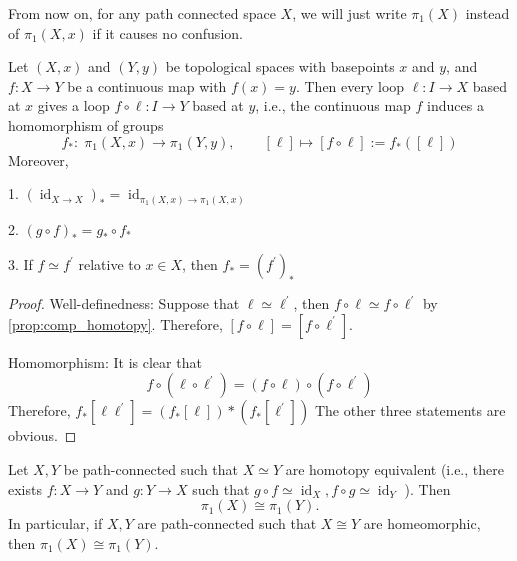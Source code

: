 From now on, for any path connected space \(X\), we will just write \({\pi }_{1}\left( X\right)\) instead of \({\pi }_{1}\left( {X,x}\right)\) if it causes no confusion.

\begin{proposition} \label{prop:pi1_homomorphism} Let $(X, x)$ and $(Y, y)$ be topological spaces with basepoints \(x\) and \(y\), and \(f : X \rightarrow  Y\) be a continuous map with \(f\left( x\right)  = y\). Then every loop \(\ell  : I \rightarrow  X\) based at \(x\) gives a loop \(f \circ  \ell  : I \rightarrow  Y\) based at \(y\), i.e., the continuous map \(f\) induces a homomorphism of groups
\[
{f}_{ * } : \;{\pi }_{1}\left( {X,x}\right)  \rightarrow  {\pi }_{1}\left( {Y,y}\right),
\quad \quad
\left\lbrack  \ell \right\rbrack   \mapsto  \left\lbrack  {f \circ  \ell }\right\rbrack   \mathrel{\text{ := }} {f}_{ * }\left( \left\lbrack  \ell \right\rbrack  \right)
\]
Moreover,

1. \({\left( {\operatorname{id}}_{X \rightarrow  X}\right) }_{ * } = {\operatorname{id}}_{{\pi }_{1}\left( {X,x}\right)  \rightarrow  {\pi }_{1}\left( {X,x}\right) }\)

2. \({\left( g \circ  f\right) }_{ * } = {g}_{ * } \circ  {f}_{ * }\)

3. If \(f \simeq  {f}^{\prime }\) relative to \(x \in  X\), then \({f}_{ * } = {\left( {f}^{\prime }\right) }_{ * }\)
\end{proposition}

\begin{proof}
Well-definedness: Suppose that \(\ell  \simeq  {\ell }^{\prime }\), then \(f \circ  \ell  \simeq  f \circ  {\ell }^{\prime }\) by \autoref{prop:comp_homotopy}.
Therefore, \(\left\lbrack  {f \circ  \ell }\right\rbrack   = \left\lbrack  {f \circ  {\ell }^{\prime }}\right\rbrack\).

Homomorphism: It is clear that
\[
f \circ  \left( {\ell  \circ  {\ell }^{\prime }}\right)  = \left( {f \circ  \ell }\right)  \circ  \left( {f \circ  {\ell }^{\prime }}\right)
\]
Therefore, \({f}_{ * }\left\lbrack  {\ell {\ell }^{\prime }}\right\rbrack   = \left( {{f}_{ * }\left\lbrack  \ell \right\rbrack  }\right)  * \left( {{f}_{ * }\left\lbrack  {\ell }^{\prime }\right\rbrack  }\right)\)
The other three statements are obvious.
\end{proof}

\begin{proposition} \label{prop:homotopy_equiv_isomorphism} Let \(X,Y\) be path-connected such that \(X \simeq  Y\) are homotopy equivalent (i.e., there exists \(f : X \rightarrow  Y\) and \(g : Y \rightarrow  X\) such that \(g \circ  f \simeq  {\operatorname{id}}_{X},f \circ  g \simeq  {\operatorname{id}}_{Y}\) ). Then 
\[{\pi }_{1}\left( X\right)  \cong  {\pi }_{1}\left( Y\right).\]
In particular, if \(X,Y\) are path-connected such that \(X \cong  Y\) are homeomorphic, then \({\pi }_{1}\left( X\right)  \cong  {\pi }_{1}\left( Y\right)\).
\end{proposition}

